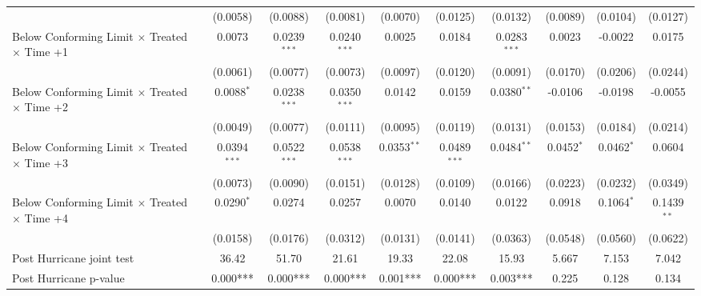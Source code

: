 \begin{tabular}{lccccccccc}
                                                              & (0.0058)       & (0.0088)        & (0.0081)       & (0.0070)      & (0.0125)       & (0.0132)       & (0.0089)     & (0.0104)     & (0.0127)\\   
   Below Conforming Limit $\times$ Treated $\times$ Time +1   & 0.0073         & 0.0239$^{***}$  & 0.0240$^{***}$ & 0.0025        & 0.0184         & 0.0283$^{***}$ & 0.0023       & -0.0022      & 0.0175\\   
                                                              & (0.0061)       & (0.0077)        & (0.0073)       & (0.0097)      & (0.0120)       & (0.0091)       & (0.0170)     & (0.0206)     & (0.0244)\\   
   Below Conforming Limit $\times$ Treated $\times$ Time +2   & 0.0088$^{*}$   & 0.0238$^{***}$  & 0.0350$^{***}$ & 0.0142        & 0.0159         & 0.0380$^{**}$  & -0.0106      & -0.0198      & -0.0055\\   
                                                              & (0.0049)       & (0.0077)        & (0.0111)       & (0.0095)      & (0.0119)       & (0.0131)       & (0.0153)     & (0.0184)     & (0.0214)\\   
   Below Conforming Limit $\times$ Treated $\times$ Time +3   & 0.0394$^{***}$ & 0.0522$^{***}$  & 0.0538$^{***}$ & 0.0353$^{**}$ & 0.0489$^{***}$ & 0.0484$^{**}$  & 0.0452$^{*}$ & 0.0462$^{*}$ & 0.0604\\   
                                                              & (0.0073)       & (0.0090)        & (0.0151)       & (0.0128)      & (0.0109)       & (0.0166)       & (0.0223)     & (0.0232)     & (0.0349)\\   
   Below Conforming Limit $\times$ Treated $\times$ Time +4   & 0.0290$^{*}$   & 0.0274          & 0.0257         & 0.0070        & 0.0140         & 0.0122         & 0.0918       & 0.1064$^{*}$ & 0.1439$^{**}$\\   
                                                              & (0.0158)       & (0.0176)        & (0.0312)       & (0.0131)      & (0.0141)       & (0.0363)       & (0.0548)     & (0.0560)     & (0.0622)\\   
   Post Hurricane joint test                                  & 36.42          & 51.70           & 21.61          & 19.33         & 22.08          & 15.93          & 5.667        & 7.153        & 7.042\\  
   Post Hurricane p-value                                     & 0.000***       & 0.000***        & 0.000***       & 0.001***      & 0.000***       & 0.003***       & 0.225        & 0.128        & 0.134\\  

\end{tabular}
